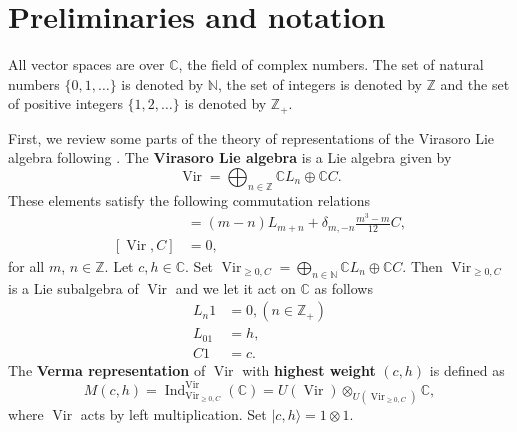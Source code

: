 \documentclass[12pt, a4paper]{article}
\theoremstyle{remark}
\DeclareMathOperator{\Vir}{Vir}
\DeclareMathOperator{\Ind}{Ind}
\begin{document}
\section{Preliminaries and notation}
\label{sec:prel-notat}
All vector spaces are over $\mathbb{C}$, the field of complex numbers.
The set of natural numbers $\{0, 1, \dots\}$ is denoted by $\mathbb{N}$, the set of integers is denoted by $\mathbb{Z}$ and the set of positive integers $\{1, 2, \dots\}$ is denoted by $\mathbb{Z}_+$.

First, we review some parts of the theory of representations of the Virasoro Lie algebra following \cite{kac_bombay_2013}.
The \textbf{Virasoro Lie algebra} is a Lie algebra given by
\begin{equation*}
  \Vir = \bigoplus_{n \in \mathbb{Z}}\mathbb{C}L_n \oplus \mathbb{C}C.
\end{equation*}
These elements satisfy the following commutation relations
\begin{align*}
  [L_m, L_n] &= (m - n)L_{m + n} + \delta_{m, -n}\frac{m^3 -m}{12}C, \\
  [\Vir, C] &= 0, 
\end{align*}
for all $m$, $n \in \mathbb{Z}$.
Let $c, h \in \mathbb{C}$.
Set $\Vir_{\ge 0, C} = \bigoplus_{n \in \mathbb{N}}\mathbb{C}L_n \oplus \mathbb{C}C$.
Then $\Vir_{\ge 0, C}$ is a Lie subalgebra of $\Vir$ and we let it act on $\mathbb{C}$ as follows
\begin{align*}
  L_n1 &= 0, (n \in \mathbb{Z}_+) \\
  L_01 &= h, \\
  C1 &= c.
\end{align*}
The \textbf{Verma representation} of $\Vir$ with \textbf{highest weight} $(c, h)$ is defined as 
\begin{equation*}
  M(c, h) = \Ind^{\Vir}_{\Vir_{\ge 0, C}}(\mathbb{C}) = U(\Vir) \otimes_{U(\Vir_{\ge 0, C})} \mathbb{C},
\end{equation*}
where $\Vir$ acts by left multiplication.
Set $|c, h\rangle = 1 \otimes 1$.
\end{document}
